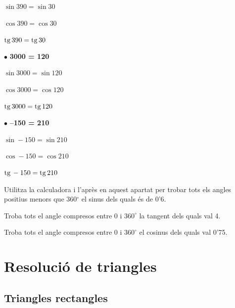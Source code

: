 \begin{mylist}
{	$\sin 390=\sin 30$\par$\cos 390=\cos 30$\par$\mathrm{tg}\, 390=\mathrm{tg}\, 30$\par\par
	$\bullet$ \textbf{3000 = 120} \par\par
	$\sin 3000=\sin 120$\par$\cos 3000=\cos 120$\par$\mathrm{tg}\, 3000=\mathrm{tg}\, 120$\par\par
	$\bullet$ \textbf{--150 = 210} \par\par
	$\sin -150=\sin 210$\par$\cos -150=\cos 210$\par$\mathrm{tg}\, -150=\mathrm{tg}\, 210$\par\par
}
	
	\exer
	Utilitza la calculadora i l'après en aquest apartat per trobar tots
	els angles positius menors que 360${}^\circ$ el sinus dels quals
	és de 0'6.
	
	\exer
	Troba tots el angle compresos entre 0 i $360^\circ$ la tangent dels quals val 4.
	
	\exer
	Troba tots el angle compresos entre 0 i $360^\circ$ el cosinus dels quals val 0'75.
	
\end{mylist}	



\section{Resolució de triangles}

\subsection{Triangles rectangles}

